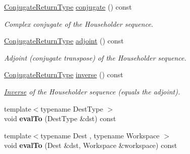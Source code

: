 \begin{DoxyCompactItemize}
\mbox{\label{group___householder___module_ac71fa85a4f177b0aeb1026752aea5590}} 
\hyperlink{group___householder___module_class_eigen_1_1_householder_sequence}{Conjugate\+Return\+Type} \hyperlink{group___householder___module_ac71fa85a4f177b0aeb1026752aea5590}{conjugate} () const
\begin{DoxyCompactList}\small\item\em Complex conjugate of the Householder sequence. \end{DoxyCompactList}\item 
\mbox{\label{group___householder___module_a40ca81cf392d8de4c747dbbdd6bd6545}} 
\hyperlink{group___householder___module_class_eigen_1_1_householder_sequence}{Conjugate\+Return\+Type} \hyperlink{group___householder___module_a40ca81cf392d8de4c747dbbdd6bd6545}{adjoint} () const
\begin{DoxyCompactList}\small\item\em Adjoint (conjugate transpose) of the Householder sequence. \end{DoxyCompactList}\item 
\mbox{\label{group___householder___module_af030b5ac2151241aeb920f74e8f73b4a}} 
\hyperlink{group___householder___module_class_eigen_1_1_householder_sequence}{Conjugate\+Return\+Type} \hyperlink{group___householder___module_af030b5ac2151241aeb920f74e8f73b4a}{inverse} () const
\begin{DoxyCompactList}\small\item\em \hyperlink{class_eigen_1_1_inverse}{Inverse} of the Householder sequence (equals the adjoint). \end{DoxyCompactList}\item 
\mbox{\label{group___householder___module_a7ce31c14a7bb7ef488c1f337af2fe010}} 
{\footnotesize template$<$typename Dest\+Type $>$ }\\void {\bfseries eval\+To} (Dest\+Type \&dst) const
\item 
\mbox{\label{group___householder___module_a91d5354eb63c6d25e977fa4d393c78c4}} 
{\footnotesize template$<$typename Dest , typename Workspace $>$ }\\void {\bfseries eval\+To} (Dest \&dst, Workspace \&workspace) const

\end{DoxyCompactItemize}
